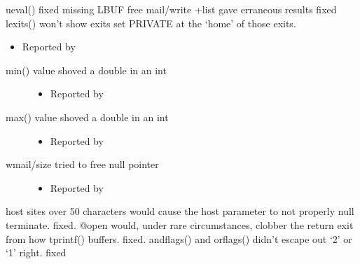 \documentclass[letterpaper,10pt,english]{sphinxmanual}
\begin{document}
\sphinxAtStartPar
ueval() \sphinxhyphen{} fixed missing LBUF free
mail/write +list \sphinxhyphen{} gave erraneous results \sphinxhyphen{} fixed
lexits() \sphinxhyphen{} won’t show exits set PRIVATE at the ‘home’ of those exits.
\begin{itemize}
\item {} 
\sphinxAtStartPar
Reported by 

\end{itemize}
\begin{description}
\item[{min() \sphinxhyphen{} value shoved a double in an int}] \leavevmode\begin{itemize}
\item {} 
\sphinxAtStartPar
Reported by 

\end{itemize}

\item[{max() \sphinxhyphen{} value shoved a double in an int}] \leavevmode\begin{itemize}
\item {} 
\sphinxAtStartPar
Reported by 

\end{itemize}

\item[{wmail/size \sphinxhyphen{} tried to free null pointer}] \leavevmode\begin{itemize}
\item {} 
\sphinxAtStartPar
Reported by 

\end{itemize}

\end{description}

\sphinxAtStartPar
host sites over 50 characters would cause the host parameter to not
properly null terminate.  \sphinxhyphen{} fixed.
@open would, under rare circumstances, clobber the return exit from
how tprintf() buffers. \sphinxhyphen{}fixed.
andflags() and orflags() didn’t escape out ‘2’ or ‘1’ right. \sphinxhyphen{} fixed
\end{document}
